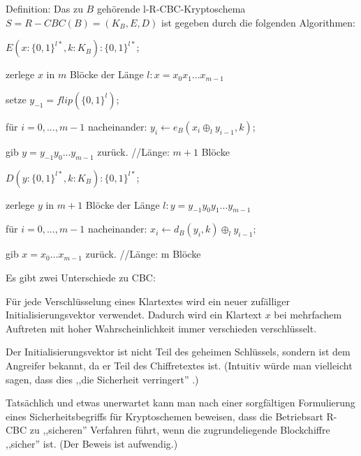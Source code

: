 \documentclass[a4paper]{article}
\begin{document}
\begin{multicols}{3}
    Definition: Das zu $B$ gehörende l-R-CBC-Kryptoschema $S=R-CBC(B) = (K_B,E,D)$ ist gegeben durch die folgenden Algorithmen:
    \begin{itemize*}
        \item $E(x:\{0,1\}^{l*},k:K_B) :\{0,1\}^{l*}$;
        \item zerlege $x$ in $m$ Blöcke der Länge $l:x=x_0 x_1 ...x_{m-1}$
        \item setze $y_{-1}= flip(\{0,1\}^l)$;
        \item für $i=0,...,m-1$ nacheinander: $y_i\leftarrow e_B(x_i\oplus_l y_{i-1} ,k)$;
        \item gib $y=y_{-1} y_0 ...y_{m-1}$ zurück. //Länge: $m+1$ Blöcke
        \item $D(y:\{0,1\}^{l*},k:K_B) :\{0,1\}^{l*}$;
        \item zerlege $y$ in $m+1$ Blöcke der Länge $l:y=y_{-1} y_0 y_1 ...y_{m-1}$
        \item für $i=0,...,m-1$ nacheinander: $x_i\leftarrow d_B(y_i,k)\oplus_l y_{i-1}$;
        \item gib $x=x_0 ...x_{m-1}$ zurück. //Länge: m Blöcke
    \end{itemize*}

    Es gibt zwei Unterschiede zu CBC:
    \begin{enumerate*}
        \item Für jede Verschlüsselung eines Klartextes wird ein neuer zufälliger Initialisierungsvektor verwendet. Dadurch wird ein Klartext $x$ bei mehrfachem Auftreten mit hoher Wahrscheinlichkeit immer verschieden verschlüsselt.
        \item Der Initialisierungsvektor ist nicht Teil des geheimen Schlüssels, sondern ist dem Angreifer bekannt, da er Teil des Chiffretextes ist. (Intuitiv würde man vielleicht sagen, dass dies ,,die Sicherheit verringert'' .)
    \end{enumerate*}

    Tatsächlich und etwas unerwartet kann man nach einer sorgfältigen Formulierung eines Sicherheitsbegriffs für Kryptoschemen beweisen, dass die Betriebsart R-CBC zu ,,sicheren'' Verfahren führt, wenn die zugrundeliegende Blockchiffre ,,sicher'' ist. (Der Beweis ist
    aufwendig.)


\end{multicols}
\end{document}

